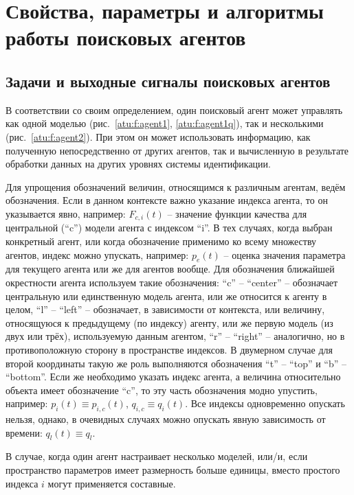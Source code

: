 

\section{Свойства, параметры и алгоритмы работы поисковых агентов}  %

\subsection{Задачи и выходные сигналы поисковых агентов} %

В соответствии со своим определением,
один поисковый агент может управлять как одной моделью (рис.~\ref{atu:f:agent1}, \ref{atu:f:agent1q}),
так и несколькими (рис.~\ref{atu:f:agent2}).
При этом он может использовать информацию,
как полученную непосредственно от других агентов,
так и вычисленную в результате обработки данных на других уровнях системы идентификации.

Для упрощения обозначений величин, относящимся к различным агентам,
ведём обозначения. Если в данном контексте важно указание
индекса агента, то он указывается явно, например:
$F_{c,i}(t)$ -- значение функции качества для центральной (``c'') модели
агента с индексом ``i''. В тех случаях, когда
выбран конкретный агент, или когда обозначение применимо
ко всему множеству агентов, индекс можно упускать, например:
$p_e(t)$ -- оценка значения параметра для текущего агента
или же для агентов вообще. Для обозначения ближайшей окрестности
агента используем такие обозначения:
``c'' -- ``center'' -- обозначает центральную или единственную
модель агента, или же относится к агенту в целом,
``l'' -- ``left'' -- обозначает, в зависимости от контекста,
или величину, относящуюся к предыдущему (по индексу) агенту,
или же первую модель (из двух или трёх), используемую
данным агентом,
``r'' -- ``right'' -- аналогично,
но в противоположную сторону в пространстве индексов.
В двумерном случае для второй координаты такую же роль
выполняются обозначения ``t'' -- ``top''
и ``b'' -- ``bottom''.
Если же необходимо указать индекс агента,
а величина относительно объекта
имеет обозначение ``c'', то эту часть обозначения
модно упустить, например:
$ p_i(t) \equiv p_{i,c}(t)$, $q_{i,c} \equiv q_{i}(t)$.
Все индексы одновременно опускать нельзя,
однако, в очевидных случаях можно опускать явную
зависимость от времени:
$ q_l(t) \equiv q_l$.

В случае, когда один агент настраивает несколько моделей,
или/и, если пространство параметров имеет размерность больше единицы,
вместо простого индекса $i$ могут применяется составные.

